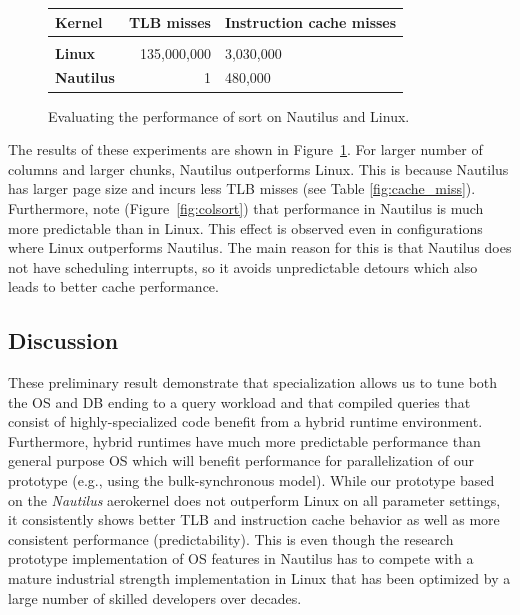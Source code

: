 \documentclass[conference]{IEEEtran}
\begin{document}
\begin{figure}[t]
  \hspace{0.01\linewidth}
  \begin{minipage}{0.31\linewidth}
    \centering
      \begin{tabular}{l || r | p{1.6cm} }
        \textbf{Kernel}    & TLB misses  & Instruction cache misses \\[1mm]
        \hline\hline&&\\[-2mm]
        \textbf{Linux}     & 135,000,000 & 3,030,000 \\[2mm]
         \textbf{Nautilus} &           1 &   480,000 \\[2mm]
      \end{tabular}

    \label{fig:cache_miss}
  \end{minipage}

\caption{Evaluating the performance of sort on Nautilus and Linux.}
  \label{fig:perf-eval}
\end{figure}

The results of these experiments are shown in Figure~\ref{fig:perf-eval}. For larger number of columns and larger chunks, Nautilus outperforms Linux. This is because Nautilus has larger page size and incurs less TLB misses (see Table \ref{fig:cache_miss}). Furthermore, note (Figure~\ref{fig:colsort}) that performance in Nautilus is much more predictable than in Linux. This effect is observed even in configurations where Linux outperforms Nautilus. The main reason for this is that Nautilus does not have scheduling interrupts, so it avoids unpredictable detours which also leads to better cache performance.



\subsection{Discussion}
\label{sec:discussion}


These preliminary result demonstrate that specialization allows us to tune both the OS and DB ending to a query workload and that compiled queries that consist of highly-specialized code benefit from a hybrid runtime environment.
Furthermore, hybrid runtimes have much more predictable performance than general purpose OS which will benefit performance for parallelization of our prototype (e.g., using the bulk-synchronous model).
While our prototype based on the \emph{Nautilus} aerokernel does not outperform Linux on all parameter settings, it consistently shows better TLB and instruction cache behavior as well as more consistent performance (predictability). This is even though the  research prototype implementation of OS features in Nautilus has to compete with a mature industrial strength implementation in Linux that has been optimized by a large number of skilled developers over decades.
\end{document}
